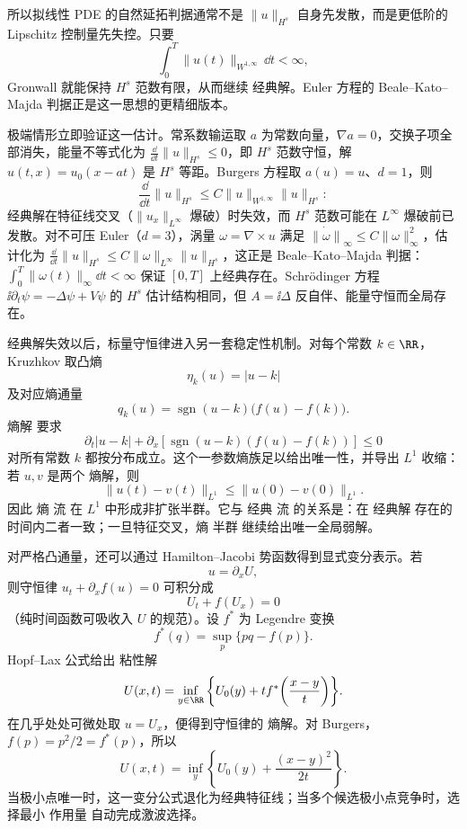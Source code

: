 所以拟线性 PDE 的自然延拓判据通常不是 $\|u\|_{H^s}$ 自身先发散，而是更低阶的 Lipschitz 控制量先失控。只要
\[
\int_0^T\|u(t)\|_{W^{1,\infty}}\,\dd t<\infty,
\]
Gronwall 就能保持 $H^s$ 范数有限，从而继续 经典解。Euler 方程的 Beale--Kato--Majda 判据正是这一思想的更精细版本。

极端情形立即验证这一估计。常系数输运取 $a$ 为常数向量，$\nabla a=0$，交换子项全部消失，能量不等式化为 $\frac{\dd}{\dd t}\|u\|_{H^s}\le0$，即 $H^s$ 范数守恒，解 $u(t,x)=u_0(x-at)$ 是 $H^s$ 等距。Burgers 方程取 $a(u)=u$、$d=1$，则
\[
\frac{\dd}{\dd t}\|u\|_{H^s}\le C\|u\|_{W^{1,\infty}}\|u\|_{H^s}:
\]
经典解在特征线交叉（$\|u_x\|_{L^\infty}$ 爆破）时失效，而 $H^s$ 范数可能在 $L^\infty$ 爆破前已发散。对不可压 Euler（$d=3$），涡量 $\omega=\nabla\times u$ 满足 $\dot{\|\omega\|}_\infty\le C\|\omega\|_\infty^2$，估计化为 $\frac{\dd}{\dd t}\|u\|_{H^s}\le C\|\omega\|_{L^\infty}\|u\|_{H^s}$，这正是 Beale--Kato--Majda 判据：$\int_0^T\|\omega(t)\|_\infty\dd t<\infty$ 保证 $[0,T]$ 上经典存在。Schr\"odinger 方程 $\ii\partial_t\psi=-\Delta\psi+V\psi$ 的 $H^s$ 估计结构相同，但 $A=\ii\Delta$ 反自伴、能量守恒而全局存在。

经典解失效以后，标量守恒律进入另一套稳定性机制。对每个常数 $k\in\RR$，Kruzhkov 取凸熵
\[
\eta_k(u)=|u-k|
\]
及对应熵通量
\[
q_k(u)
=\operatorname{sgn}(u-k)\bigl(f(u)-f(k)\bigr).
\]
熵解 要求
\begin{equation*}\partial_t|u-k|
+\partial_x\!
\left[
\operatorname{sgn}(u-k)(f(u)-f(k))
\right]
\le0\end{equation*}
对所有常数 $k$ 都按分布成立。这个一参数熵族足以给出唯一性，并导出 $L^1$ 收缩：若 $u,v$ 是两个 熵解，则
\begin{equation*}{
\|u(t)-v(t)\|_{L^1}
\le
\|u(0)-v(0)\|_{L^1}
}.\end{equation*}
因此 熵 流 在 $L^1$ 中形成非扩张半群。它与 经典 流 的关系是：在 经典解 存在的时间内二者一致；一旦特征交叉，熵 半群 继续给出唯一全局弱解。

对严格凸通量，还可以通过 Hamilton--Jacobi 势函数得到显式变分表示。若
\[
u=\partial_x U,
\]
则守恒律 $u_t+\partial_xf(u)=0$ 可积分成
\[
U_t+f(U_x)=0
\]
（纯时间函数可吸收入 $U$ 的规范）。设 $f^*$ 为 Legendre 变换
\[
f^*(q)=\sup_p\{pq-f(p)\}.
\]
Hopf--Lax 公式给出 粘性解
\begin{equation*}{
U(x,t)
=
\inf_{y\in\RR}
\left
\{
U_0(y)
+t f^*\!\left(\frac{x-y}{t}\right)
\right\}
}.\end{equation*}
在几乎处处可微处取 $u=U_x$，便得到守恒律的 熵解。对 Burgers，$f(p)=p^2/2=f^*(p)$，所以
\[
U(x,t)
=
\inf_y\left\{
U_0(y)+\frac{(x-y)^2}{2t}
\right\}.
\]
当极小点唯一时，这一变分公式退化为经典特征线；当多个候选极小点竞争时，选择最小 作用量 自动完成激波选择。


